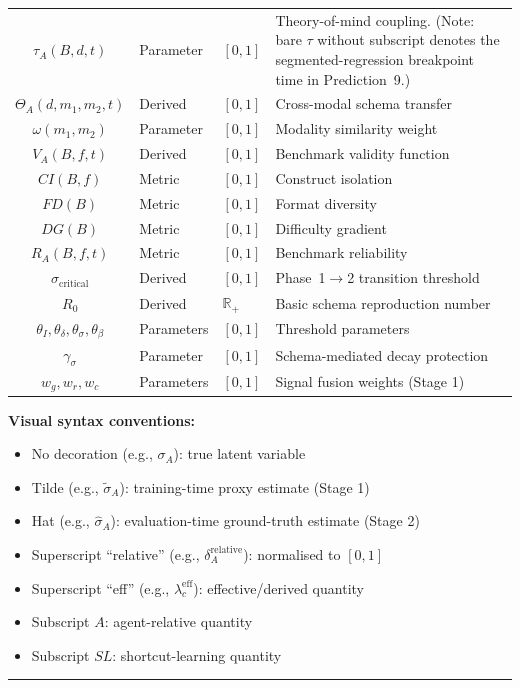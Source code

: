 \documentclass[11pt,a4paper]{article}
\newcommand{\R}{\mathbb{R}}
\begin{document}
\begin{center}
{\begin{tabular}{c l l l}
$\tau_A(B,d,t)$ & Parameter & $[0,1]$ & Theory-of-mind coupling. (Note: bare $\tau$ without subscript denotes the segmented-regression breakpoint time in Prediction~9.) \\
$\Theta_A(d,m_1,m_2,t)$ & Derived & $[0,1]$ & Cross-modal schema transfer \\
$\omega(m_1,m_2)$ & Parameter & $[0,1]$ & Modality similarity weight \\
$V_A(B,f,t)$ & Derived & $[0,1]$ & Benchmark validity function \\
$CI(B,f)$ & Metric & $[0,1]$ & Construct isolation \\
$FD(B)$ & Metric & $[0,1]$ & Format diversity \\
$DG(B)$ & Metric & $[0,1]$ & Difficulty gradient \\
$R_A(B,f,t)$ & Metric & $[0,1]$ & Benchmark reliability \\
$\sigma_{\text{critical}}$ & Derived & $[0,1]$ & Phase~1$\to$2 transition threshold \\
$R_0$ & Derived & $\R_+$ & Basic schema reproduction number \\
$\theta_I, \theta_\delta, \theta_\sigma, \theta_\beta$ & Parameters & $[0,1]$ & Threshold parameters \\
$\gamma_\sigma$ & Parameter & $[0,1]$ & Schema-mediated decay protection \\
$w_g, w_r, w_c$ & Parameters & $[0,1]$ & Signal fusion weights (Stage 1) \\
\bottomrule
\end{tabular}%
}
\end{center}

\textbf{Visual syntax conventions:}
\begin{itemize}[nosep]
\item No decoration (e.g., $\sigma_A$): true latent variable
\item Tilde (e.g., $\tilde{\sigma}_A$): training-time proxy estimate (Stage 1)
\item Hat (e.g., $\hat{\sigma}_A$): evaluation-time ground-truth estimate (Stage 2)
\item Superscript ``relative'' (e.g., $\delta_A^{\text{relative}}$): normalised to $[0,1]$
\item Superscript ``eff'' (e.g., $\lambda_c^{\text{eff}}$): effective/derived quantity
\item Subscript $A$: agent-relative quantity
\item Subscript $SL$: shortcut-learning quantity
\end{itemize}

\noindent\rule{\linewidth}{0.4pt}



\end{document}
